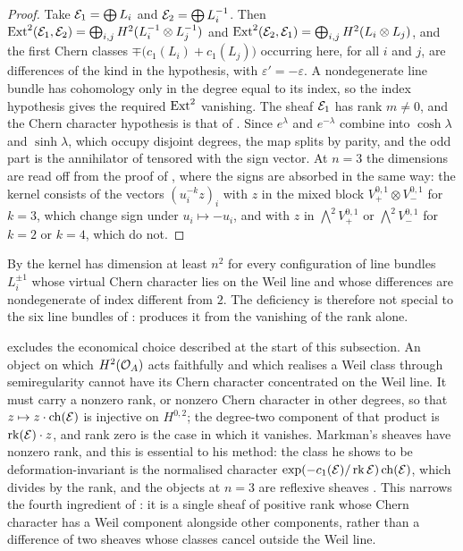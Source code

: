 \begin{proof}
Take $\mathcal{E}_{1}=\bigoplus L_{i}$ and $\mathcal{E}_{2}=\bigoplus L_{i}^{-1}$. Then
$\operatorname{Ext}^{2}(\mathcal{E}_{1},\mathcal{E}_{2})=\bigoplus_{i,j}H^{2}(L_{i}^{-1}\otimes L_{j}^{-1})$
and $\operatorname{Ext}^{2}(\mathcal{E}_{2},\mathcal{E}_{1})=\bigoplus_{i,j}H^{2}(L_{i}\otimes L_{j})$, and
the first Chern classes $\mp\bigl(c_{1}(L_{i})+c_{1}(L_{j})\bigr)$ occurring
here, for all $i$ and $j$, are differences of the kind in the hypothesis,
with $\varepsilon'=-\varepsilon$. A nondegenerate line bundle has cohomology only in
the degree equal to its index, so the index hypothesis gives the required
$\operatorname{Ext}^{2}$ vanishing. The sheaf $\mathcal{E}_{1}$ has rank $m\ne0$, and the Chern
character hypothesis is that of .
Since $e^{\lambda}$ and $e^{-\lambda}$ combine into $\cosh\lambda$ and
$\sinh\lambda$, which occupy disjoint degrees, the map splits by parity, and
the odd part is the annihilator of  tensored with the
sign vector. At $n=3$ the dimensions are read off from the proof of
, where the signs are absorbed in the same way:
the kernel consists of the vectors $(u_{i}^{-k}z)_{i}$ with $z$ in the mixed
block $V_{+}^{0,1}\otimes V_{-}^{0,1}$ for $k=3$, which change sign under
$u_{i}\mapsto-u_{i}$, and with $z$ in $\bigwedge^{2}V_{+}^{0,1}$ or
$\bigwedge^{2}V_{-}^{0,1}$ for $k=2$ or $k=4$, which do not.
\end{proof}

\begin{remark}
\label{rem:familyuniform}
By  the kernel has dimension at least $n^{2}$ for
every configuration of line bundles $L_{i}^{\pm1}$ whose virtual Chern
character lies on the Weil line and whose differences are nondegenerate of
index different from $2$. The deficiency is therefore not special to the six
line bundles of :  produces it
from the vanishing of the rank alone.

 excludes the economical choice described at the start of
this subsection. An object on which $H^{2}(\mathcal{O}_{A})$ acts faithfully and which
realises a Weil class through semiregularity cannot have its Chern character
concentrated on the Weil line. It must carry a nonzero rank, or nonzero Chern
character in other degrees, so that $z\mapsto z\cdot\operatorname{ch}(\mathcal{E})$ is injective on
$H^{0,2}$; the degree-two component of that product is $\operatorname{rk}(\mathcal{E})\cdot z$, and
rank zero is the case in which it vanishes. Markman's sheaves have nonzero
rank, and this is essential to his method: the class he shows to be
deformation-invariant is the normalised character
$\exp(-c_{1}(\mathcal{E})/\operatorname{rk}\mathcal{E})\operatorname{ch}(\mathcal{E})$, which divides by the rank, and the objects
at $n=3$ are reflexive sheaves \cite{Mar25a,Mar25b}. This narrows the fourth
ingredient of : it is a single sheaf of positive rank
whose Chern character has a Weil component alongside other components, rather
than a difference of two sheaves whose classes cancel outside the Weil line.
\end{remark}

